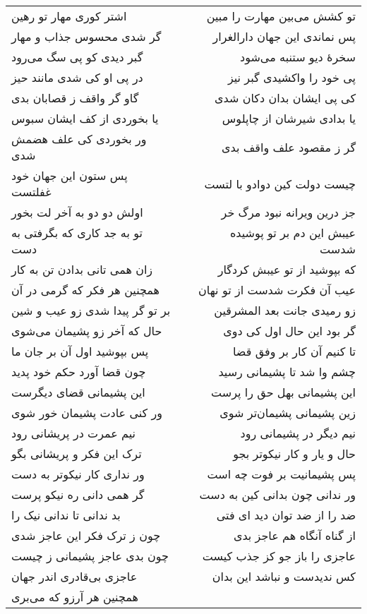 \begin{center}
\begin{longtable}{l p{0.5cm} r}
اشتر کوری مهار تو رهین
&&
تو کشش می‌بین مهارت را مبین
\\
گر شدی محسوس جذاب و مهار
&&
پس نماندی این جهان دارالغرار
\\
گبر دیدی کو پی سگ می‌رود
&&
سخرهٔ دیو ستنبه می‌شود
\\
در پی او کی شدی مانند حیز
&&
پی خود را واکشیدی گبر نیز
\\
گاو گر واقف ز قصابان بدی
&&
کی پی ایشان بدان دکان شدی
\\
یا بخوردی از کف ایشان سبوس
&&
یا بدادی شیرشان از چاپلوس
\\
ور بخوردی کی علف هضمش شدی
&&
گر ز مقصود علف واقف بدی
\\
پس ستون این جهان خود غفلتست
&&
چیست دولت کین دوادو با لتست
\\
اولش دو دو به آخر لت بخور
&&
جز درین ویرانه نبود مرگ خر
\\
تو به جد کاری که بگرفتی به دست
&&
عیبش این دم بر تو پوشیده شدست
\\
زان همی تانی بدادن تن به کار
&&
که بپوشید از تو عیبش کردگار
\\
همچنین هر فکر که گرمی در آن
&&
عیب آن فکرت شدست از تو نهان
\\
بر تو گر پیدا شدی زو عیب و شین
&&
زو رمیدی جانت بعد المشرقین
\\
حال که آخر زو پشیمان می‌شوی
&&
گر بود این حال اول کی دوی
\\
پس بپوشید اول آن بر جان ما
&&
تا کنیم آن کار بر وفق قضا
\\
چون قضا آورد حکم خود پدید
&&
چشم وا شد تا پشیمانی رسید
\\
این پشیمانی قضای دیگرست
&&
این پشیمانی بهل حق را پرست
\\
ور کنی عادت پشیمان خور شوی
&&
زین پشیمانی پشیمان‌تر شوی
\\
نیم عمرت در پریشانی رود
&&
نیم دیگر در پشیمانی رود
\\
ترک این فکر و پریشانی بگو
&&
حال و یار و کار نیکوتر بجو
\\
ور نداری کار نیکوتر به دست
&&
پس پشیمانیت بر فوت چه است
\\
گر همی دانی ره نیکو پرست
&&
ور ندانی چون بدانی کین به دست
\\
بد ندانی تا ندانی نیک را
&&
ضد را از ضد توان دید ای فتی
\\
چون ز ترک فکر این عاجز شدی
&&
از گناه آنگاه هم عاجز بدی
\\
چون بدی عاجز پشیمانی ز چیست
&&
عاجزی را باز جو کز جذب کیست
\\
عاجزی بی‌قادری اندر جهان
&&
کس ندیدست و نباشد این بدان
\\
همچنین هر آرزو که می‌بری

\end{longtable}
\end{center}
